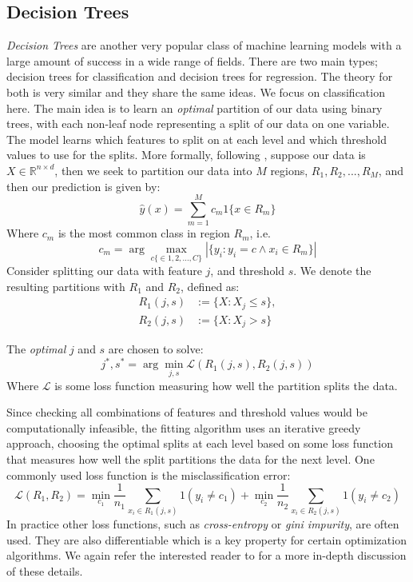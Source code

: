 \subsection{Decision Trees}
\textit{Decision Trees} are another very popular class of machine learning models with a
large amount of success in a wide range of fields. There are two main types; decision trees
for classification and decision trees for regression. The theory for both is very similar
and they share the same ideas. We focus on classification here.
The main idea is to learn an \textit{optimal} partition of our data using binary trees,
with each non-leaf node representing a split of our data on one variable.
The model learns which features to split on at each level and which threshold values to use for the splits.
More formally, following \cite{HASTIE2001}, suppose our data is $X \in  \mathbb{R}^{n \times d}$, then
we seek to partition our data into $M$ regions, $R_1, R_2, ..., R_M$, and then our prediction is given by:
\begin{equation}
    \hat{y}(x) = \sum_{m=1}^{M} c_m 1\{x \in  R_m\} 
\end{equation}
Where $c_m$ is the most common class in region $R_m$, i.e.
\begin{equation}
    c_m = \arg \max_{c \{\in {1, 2, ..., C}\}} |\{y_i : y_i = c \land x_i \in R_m\}|
\end{equation}
Consider splitting our data with feature $j$, and threshold $s$. We denote the resulting
partitions with $R_1$ and $R_2$, defined as: 
\begin{equation}
    \begin{aligned}
        R_1(j, s) &:= \{X : X_j \le s\}, \\
        R_2(j, s) &:= \{X : X_j >  s\} 
    \end{aligned}
\end{equation}

The \textit{optimal} $j$ and $s$ are chosen to solve:
\begin{equation}
    j^*, s^* = \arg \min_{j,s}  \mathcal{L}(R_1(j, s), R_2(j, s))
\end{equation}
Where $\mathcal{L}$ is some loss function measuring how well the partition splits the data.

Since checking all combinations of features and threshold values would be computationally infeasible, the fitting
algorithm uses an iterative greedy approach, choosing the optimal splits at each level based on some loss function that
measures how well the split partitions the data for the next level.
One commonly used loss function is the misclassification error:
\begin{equation}
        \mathcal{L}(R_1, R_2) = \min_{c_1} \frac{1}{n_1} \sum_{x_i \in  R_1(j, s)} 1(y_i \neq c_1) + \min_{c_2}\frac{1}{n_2} \sum_{x_i \in  R_2(j, s)} 1(y_i \neq c_2)
\end{equation}
In practice other loss functions, such as \textit{cross-entropy} or \textit{gini impurity}, are often used.
They are also differentiable which is a key property for certain optimization algorithms.
We again refer the interested reader to \cite{HASTIE2001} for a more in-depth discussion of these details.

